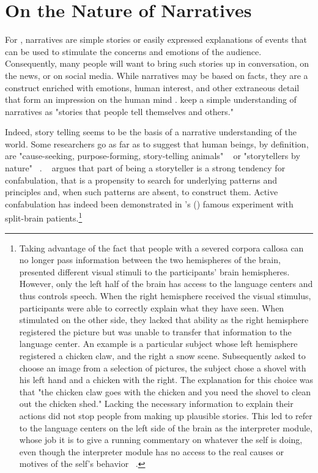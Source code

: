 \documentclass[11pt,a4paper,english,oneside]{book}
\numberwithin{equation}{chapter}
\begin{document}
\section{On the Nature of Narratives}\label{CH:2.1}

For \citeauthor{Shiller.2017}, narratives are simple stories or easily expressed explanations of events that can be used to stimulate the concerns and emotions of the audience. Consequently, many people will want to bring such stories up in conversation, on the news, or on social media. While narratives may be based on facts, they are a construct enriched with emotions, human interest, and other extraneous detail that form an impression on the human mind \cite[pp. 968--973]{Shiller.2017}. \citet[p. 58]{Akerlof.2016} keep a simple understanding of narratives as "stories that people tell themselves and others." 

Indeed, story telling seems to be the basis of a narrative understanding of the world. Some researchers go as far as to suggest that human beings, by definition, are "cause-seeking, purpose-forming, story-telling animals" ~\cite[p.~434]{Atran.2010} or "storytellers by nature" ~\cite[p.~27]{McAdams.1993}. 
~\citet[p.~434]{Atran.2010} argues that part of being a storyteller is a strong  tendency  for  confabulation,  that is a propensity to search for underlying patterns and principles and, when  such patterns are absent, to construct them. Active confabulation has indeed been demonstrated in \citeauthor{Gazzaniga.1985}'s (\citeyear{Gazzaniga.1985}) famous experiment with split-brain patients.\footnote{Taking advantage of the fact that people with a severed corpora callosa can no longer pass information between the two hemispheres of the brain, \citeauthor{Gazzaniga.1985} presented different visual stimuli to the participants' brain hemispheres. However, only the left half of the brain has access to the language centers and thus controls speech. When the right hemisphere received the visual stimulus, participants were able to correctly explain what they have seen. When stimulated on the other side, they lacked that ability as the right hemisphere registered the picture but was unable to transfer that information to the language center. An example is a particular subject whose left hemisphere registered a chicken claw, and the right a snow scene. Subsequently asked to choose an image from a selection of pictures, the subject chose a shovel with his left hand and a chicken with the right. The explanation for this choice was that "the chicken claw goes with the chicken and you need the shovel to clean out the chicken shed." Lacking the necessary information to explain their actions did not stop people from making up plausible stories. This led \citeauthor{Gazzaniga.1985} to refer to the language centers on the left side of the brain as the interpreter module, whose job it is to give a running commentary on whatever the self is doing, even though the interpreter module has no access to the real causes or motives of the self's behavior ~\citep{Gazzaniga.1985, GazzanigaM.IvryR.andMangunG..1998}.}
\end{document}
